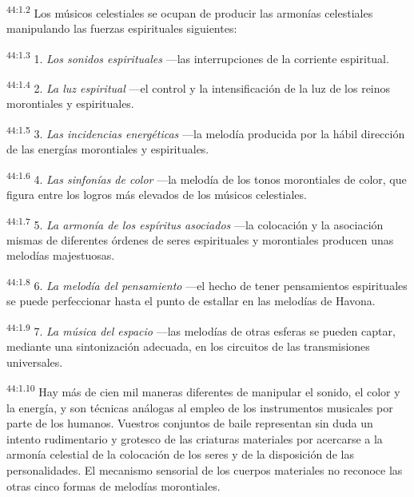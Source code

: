 \par
\textsuperscript{44:1.2} Los músicos celestiales se ocupan de producir las armonías celestiales manipulando las fuerzas espirituales siguientes:

\par
\textsuperscript{44:1.3} 1. \textit{Los sonidos espirituales} ---las interrupciones de la corriente espiritual.

\par
\textsuperscript{44:1.4} 2. \textit{La luz espiritual} ---el control y la intensificación de la luz de los reinos morontiales y espirituales.

\par
\textsuperscript{44:1.5} 3. \textit{Las incidencias energéticas} ---la melodía producida por la hábil dirección de las energías morontiales y espirituales.

\par
\textsuperscript{44:1.6} 4. \textit{Las sinfonías de color} ---la melodía de los tonos morontiales de color, que figura entre los logros más elevados de los músicos celestiales.

\par
\textsuperscript{44:1.7} 5. \textit{La armonía de los espíritus asociados} ---la colocación y la asociación mismas de diferentes órdenes de seres espirituales y morontiales producen unas melodías majestuosas.

\par
\textsuperscript{44:1.8} 6. \textit{La melodía del pensamiento} ---el hecho de tener pensamientos espirituales se puede perfeccionar hasta el punto de estallar en las melodías de Havona.

\par
\textsuperscript{44:1.9} 7. \textit{La música del espacio} ---las melodías de otras esferas se pueden captar, mediante una sintonización adecuada, en los circuitos de las transmisiones universales.

\par
\textsuperscript{44:1.10} Hay más de cien mil maneras diferentes de manipular el sonido, el color y la energía, y son técnicas análogas al empleo de los instrumentos musicales por parte de los humanos. Vuestros conjuntos de baile representan sin duda un intento rudimentario y grotesco de las criaturas materiales por acercarse a la armonía celestial de la colocación de los seres y de la disposición de las personalidades. El mecanismo sensorial de los cuerpos materiales no reconoce las otras cinco formas de melodías morontiales.

